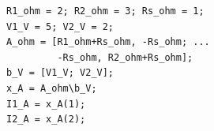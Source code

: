 \documentclass[border=12pt]{standalone}
\begin{document}
\begin{lstlisting}[style=matlab]
R1_ohm = 2; R2_ohm = 3; Rs_ohm = 1;
V1_V = 5; V2_V = 2;
A_ohm = [R1_ohm+Rs_ohm, -Rs_ohm; ...
         -Rs_ohm, R2_ohm+Rs_ohm];
b_V = [V1_V; V2_V];
x_A = A_ohm\b_V;
I1_A = x_A(1);
I2_A = x_A(2);
\end{lstlisting}
\end{document}
